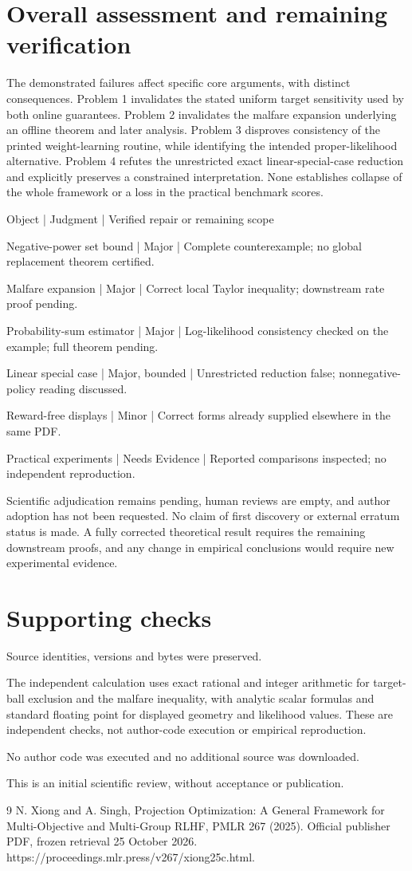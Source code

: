 \documentclass[10pt]{article}
\begin{document}
\section*{Overall assessment and remaining verification}
The demonstrated failures affect specific core arguments, with distinct consequences. Problem 1 invalidates the stated uniform target sensitivity used by both online guarantees. Problem 2 invalidates the malfare expansion underlying an offline theorem and later analysis. Problem 3 disproves consistency of the printed weight-learning routine, while identifying the intended proper-likelihood alternative. Problem 4 refutes the unrestricted exact linear-special-case reduction and explicitly preserves a constrained interpretation. None establishes collapse of the whole framework or a loss in the practical benchmark scores.\par
Object | Judgment | Verified repair or remaining scope\par
Negative-power set bound | Major | Complete counterexample; no global replacement theorem certified.\par
Malfare expansion | Major | Correct local Taylor inequality; downstream rate proof pending.\par
Probability-sum estimator | Major | Log-likelihood consistency checked on the example; full theorem pending.\par
Linear special case | Major, bounded | Unrestricted reduction false; nonnegative-policy reading discussed.\par
Reward-free displays | Minor | Correct forms already supplied elsewhere in the same PDF.\par
Practical experiments | Needs Evidence | Reported comparisons inspected; no independent reproduction.\par
Scientific adjudication remains pending, human reviews are empty, and author adoption has not been requested. No claim of first discovery or external erratum status is made. A fully corrected theoretical result requires the remaining downstream proofs, and any change in empirical conclusions would require new experimental evidence.\par
\section*{Supporting checks}
Source identities, versions and bytes were preserved.\par
The independent calculation uses exact rational and integer arithmetic for target-ball exclusion and the malfare inequality, with analytic scalar formulas and standard floating point for displayed geometry and likelihood values. These are independent checks, not author-code execution or empirical reproduction.\par
No author code was executed and no additional source was downloaded.\par
This is an initial scientific review, without acceptance or publication.\par
9 N. Xiong and A. Singh, Projection Optimization: A General Framework for Multi-Objective and Multi-Group RLHF, PMLR 267 (2025). Official publisher PDF, frozen retrieval 25 October 2026. https://proceedings.mlr.press/v267/xiong25c.html.\par
\end{document}
